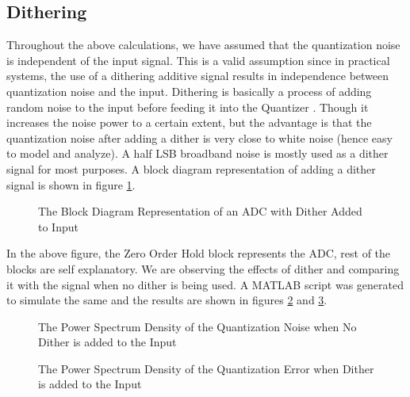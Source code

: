 \documentclass[colorlinks=true,pdfstartview=FitV,linkcolor=blue,
            citecolor=red,urlcolor=magenta]{ligodoc}
\begin{document}
\subsection{Dithering}
Throughout the above calculations, we have assumed that the quantization noise is independent of the input signal. This is a valid assumption since in practical systems, the use of a dithering additive signal results in independence between quantization noise and the input.
Dithering is basically a process of adding random noise to the input before feeding it into the Quantizer \cite{Widrow_Dither}. Though it increases the noise power to a certain extent, but the advantage is that the quantization noise after adding a dither is very close to white noise (hence easy to model and analyze).
A half LSB broadband noise is mostly used as a dither signal for most purposes.
A block diagram representation of adding a dither signal is shown in figure \ref{block1}.
\begin{figure}[htbp]
  \centering
  
  \caption{The Block Diagram Representation of an ADC with Dither Added to Input}
  \label{block1}
\end{figure}

In the above figure, the Zero Order Hold block represents the ADC, rest of the blocks are self explanatory. We are observing the effects of dither and comparing it with the signal when no dither is being used. A MATLAB script was generated to simulate the same and the results are shown in figures \ref{PSD1} and \ref{PSD2}.
 
 \begin{figure}[htbp]
  \centering
  
  \caption{The Power Spectrum Density of the Quantization Noise when No Dither is added to the Input}
 \label{PSD1}
\end{figure}

 \begin{figure}[htbp]
 
  \centering
  
  \caption{The Power Spectrum Density of the Quantization Error when Dither is added to the Input}
 \label{PSD2}
\end{figure}
\end{document}
